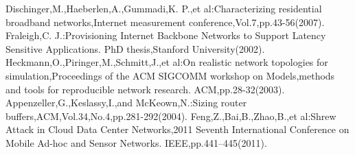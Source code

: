 \documentclass[Japanese]{dicomopapers}
\begin{document}
\begin{thebibliography}{99}
     Dischinger,M.,Haeberlen,A.,Gummadi,K. P.,et al:Characterizing residential broadband networks,Internet measurement conference,Vol.7,pp.43-56(2007).
     Fraleigh,C. J.:Provisioning Internet Backbone Networks to Support Latency Sensitive Applications. PhD thesis,Stanford University(2002).
     Heckmann,O.,Piringer,M.,Schmitt,J.,et al:On realistic network topologies for simulation,Proceedings of the ACM SIGCOMM workshop on Models,methods and tools for reproducible network research. ACM,pp.28-32(2003).
     Appenzeller,G.,Keslassy,I.,and McKeown,N.:Sizing router buffers,ACM,Vol.34,No.4,pp.281-292(2004).
     Feng,Z.,Bai,B.,Zhao,B.,et al:Shrew Attack in Cloud Data Center Networks,2011 Seventh International Conference on Mobile Ad-hoc and Sensor Networks. IEEE,pp.441–445(2011).
\end{thebibliography}
\end{document}

